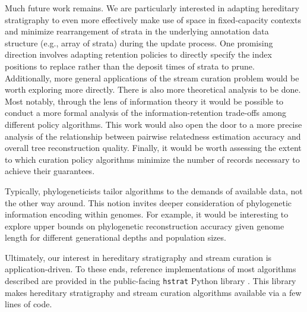 Much future work remains.
We are particularly interested in adapting hereditary stratigraphy to even more effectively make use of space in fixed-capacity contexts and minimize rearrangement of strata in the underlying annotation data structure (e.g., array of strata) during the update process.
One promising direction involves adapting retention policies to directly specify the index positions to replace rather than the deposit times of strata to prune.
Additionally, more general applications of the stream curation problem would be worth exploring more directly.
There is also more theoretical analysis to be done.
Most notably, through the lens of information theory it would be possible to conduct a more formal analysis of the information-retention trade-offs among different policy algorithms. 
This work would also open the door to a more precise analysis of the relationship between pairwise relatedness estimation accuracy and overall tree reconstruction quality.
Finally, it would be worth assessing the extent to which curation policy algorithms minimize the number of records necessary to achieve their guarantees.

Typically, phylogeneticists tailor algorithms to the demands of available data, not the other way around.
This notion invites deeper consideration of phylogenetic information encoding within genomes.
For example, it would be interesting to explore upper bounds on phylogenetic reconstruction accuracy given genome length for different generational depths and population sizes.

Ultimately, our interest in hereditary stratigraphy and stream curation is application-driven.
To these ends, reference implementations of most algorithms described are provided in the public-facing \texttt{hstrat} Python library \citep{moreno2022hstrat}.
This library makes hereditary stratigraphy and stream curation algorithms available via a few lines of code.
